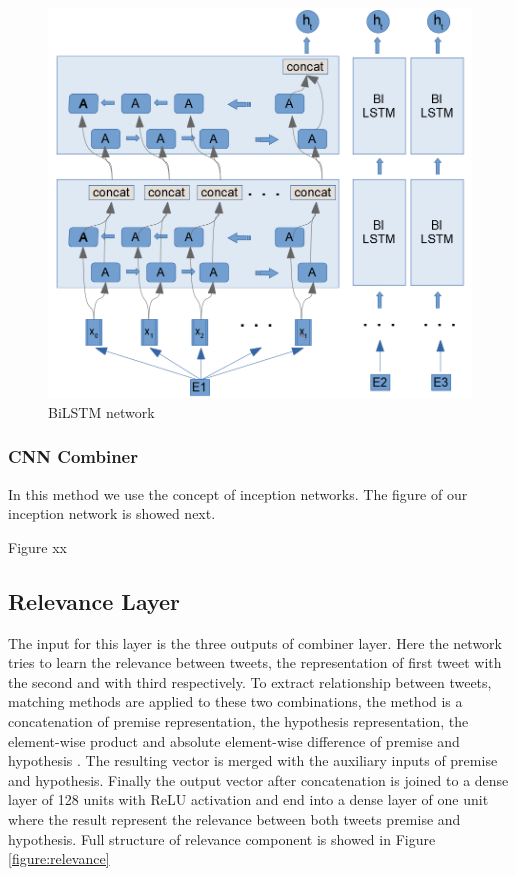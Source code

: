 \documentclass[12pt]{report}
\begin{document}
\begin{figure}[H]	
	\centering
	\includegraphics[width=150mm, scale = 1]{images/13_bilstm.png}	
	\caption{BiLSTM network}	
	\label{figure:bilstm}
\end{figure}

  
\subsubsection{\ac{CNN} Combiner}

In this method we use the concept of inception networks. The figure of our inception network is showed next.

Figure xx


\subsection{Relevance Layer}

The input for this layer is the three outputs of combiner layer. Here the network tries to learn the relevance between tweets, the representation of first tweet with the second and with third respectively. To extract relationship between tweets, matching methods are applied to these two combinations, the method is a concatenation of premise representation, the hypothesis representation, the element-wise product and absolute element-wise difference of premise and hypothesis \cite{Conneau2017}. The resulting vector is merged with the auxiliary inputs of premise and hypothesis. Finally the output vector after concatenation is joined to a dense layer of 128 units with {ReLU} activation and end into a dense layer of one unit where the result represent the relevance between both tweets premise and hypothesis. Full structure of relevance component is showed in Figure \ref{figure:relevance}
\end{document}
